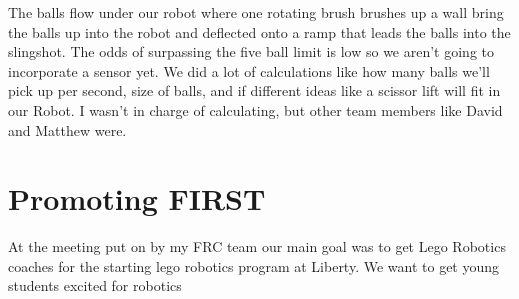 
The balls flow under our robot where one rotating brush brushes up a wall bring the
balls up into the robot and deflected onto a ramp that leads the balls into the
slingshot. The odds of surpassing the five ball limit is low so we aren’t going to incorporate a sensor yet. 
We did a lot of calculations like how many balls we’ll pick up per second, size of balls, and if different ideas like a scissor lift will fit in our Robot. I wasn’t in charge of calculating, but other team members like David and Matthew were.

\section*{Promoting FIRST}
At the meeting put on by my FRC team our main goal was to get Lego Robotics coaches for the starting lego robotics program at Liberty. We want to get young students excited for robotics 